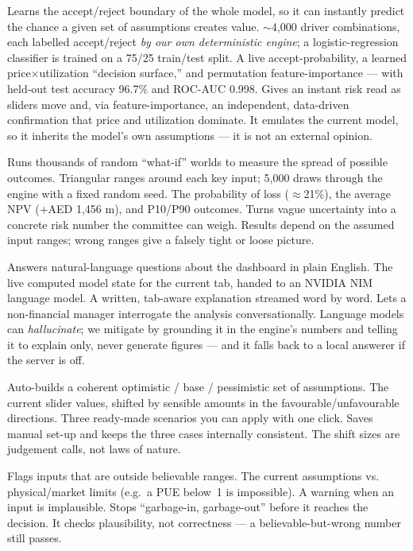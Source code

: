 \documentclass[11pt,a4paper]{article}
\begin{document}
{Learns the accept/reject boundary of the whole model, so it can instantly predict the chance a given
set of assumptions creates value.}
{$\sim$4{,}000 driver combinations, each labelled accept/reject \emph{by our own deterministic
engine}; a logistic-regression classifier is trained on a 75/25 train/test split.}
{A live accept-probability, a learned price$\times$utilization ``decision surface,'' and permutation
feature-importance --- with held-out test accuracy 96.7\% and ROC-AUC 0.998.}
{Gives an instant risk read as sliders move and, via feature-importance, an independent, data-driven
confirmation that price and utilization dominate.}
{It emulates the current model, so it inherits the model's own assumptions --- it is not an external
opinion.}

{Runs thousands of random ``what-if'' worlds to measure the spread of possible outcomes.}
{Triangular ranges around each key input; 5{,}000 draws through the engine with a fixed random seed.}
{The probability of loss ($\approx$21\%), the average NPV (+AED 1{,}456 m), and P10/P90 outcomes.}
{Turns vague uncertainty into a concrete risk number the committee can weigh.}
{Results depend on the assumed input ranges; wrong ranges give a falsely tight or loose picture.}

{Answers natural-language questions about the dashboard in plain English.}
{The live computed model state for the current tab, handed to an NVIDIA NIM language model.}
{A written, tab-aware explanation streamed word by word.}
{Lets a non-financial manager interrogate the analysis conversationally.}
{Language models can \emph{hallucinate}; we mitigate by grounding it in the engine's numbers and
telling it to explain only, never generate figures --- and it falls back to a local answerer if the
server is off.}

{Auto-builds a coherent optimistic / base / pessimistic set of assumptions.}
{The current slider values, shifted by sensible amounts in the favourable/unfavourable directions.}
{Three ready-made scenarios you can apply with one click.}
{Saves manual set-up and keeps the three cases internally consistent.}
{The shift sizes are judgement calls, not laws of nature.}

{Flags inputs that are outside believable ranges.}
{The current assumptions vs. physical/market limits (e.g.\ a PUE below~1 is impossible).}
{A warning when an input is implausible.}
{Stops ``garbage-in, garbage-out'' before it reaches the decision.}
{It checks plausibility, not correctness --- a believable-but-wrong number still passes.}
\end{document}
